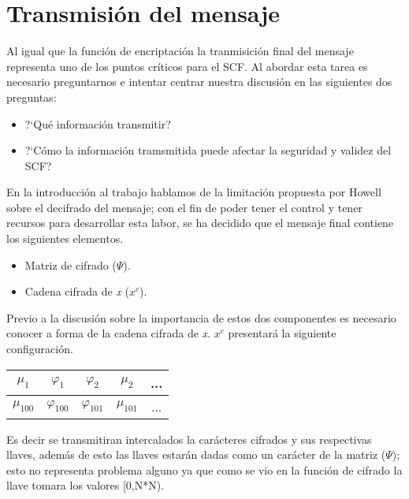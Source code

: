 \section{Transmisi\'on del mensaje}

Al igual que la funci\'on de encriptaci\'on la tranmisici\'on final del mensaje representa uno de los puntos cr\'iticos para el SCF. Al abordar esta tarea es necesario preguntarnos e intentar centrar nuestra discusi\'on en las siguientes dos preguntas:

\begin{itemize}
	\item ?`Qu\'e informaci\'on transmitir?
	\item ?`C\'omo la informaci\'on tramsmitida puede afectar la seguridad y validez del SCF?
\end{itemize}

En la introducci\'on al trabajo hablamos de la limitaci\'on propuesta por Howell \cite{Howell} sobre el decifrado del mensaje; con el fin de poder tener el control y tener recursos para desarrollar esta labor, se ha decidido que el mensaje final contiene los siguientes elementos.

\begin{itemize}
	\item Matriz de cifrado ($\Psi$).
	\item Cadena cifrada de \emph{x} ($x^{c}$).
\end{itemize}

Previo a la discusi\'on sobre la importancia de estos dos componentes es necesario conocer a forma de la cadena cifrada de \emph{x}. $x^{c}$ presentar\'a la siguiente configuraci\'on.

\begin{center}
\begin{tabular}{| c | c | c | c | c |}
	\hline
	$\mu_{1}$ & $\varphi_{1}$ & $\varphi_{2}$ & $\mu_{2}$ & ... \\
	\hline
	$\mu_{100}$ & $\varphi_{100}$ & $\varphi_{101}$ & $\mu_{101}$ & ...\\
	\hline
\end{tabular}
\end{center}

Es decir se transmitiran intercalados la car\'acteres cifrados y sus respectivas llaves, adem\'as de esto las llaves estar\'an dadas como un car\'acter de la matriz ($\Psi$); esto no representa problema alguno ya que como se vio en la funci\'on de cifrado la llave tomara los valores [0,N*N).

